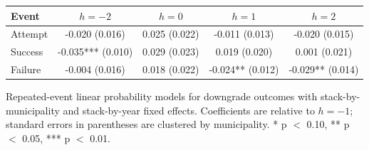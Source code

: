 \begin{center}
\scriptsize
\begin{tabular}{lcccc}
\toprule
Event & $h=-2$ & $h=0$ & $h=1$ & $h=2$ \\
\midrule
Attempt & -0.020 (0.016) & 0.025 (0.022) & -0.011 (0.013) & -0.020 (0.015) \\
Success & -0.035*** (0.010) & 0.029 (0.023) & 0.019 (0.020) & 0.001 (0.021) \\
Failure & -0.004 (0.016) & 0.018 (0.022) & -0.024** (0.012) & -0.029** (0.014) \\
\bottomrule
\end{tabular}
\vspace{0.05cm}
\parbox{0.94\textwidth}{\tiny Repeated-event linear probability models for downgrade outcomes with stack-by-municipality and stack-by-year fixed effects. Coefficients are relative to $h=-1$; standard errors in parentheses are clustered by municipality. * p $<$ 0.10, ** p $<$ 0.05, *** p $<$ 0.01.}
\end{center}
